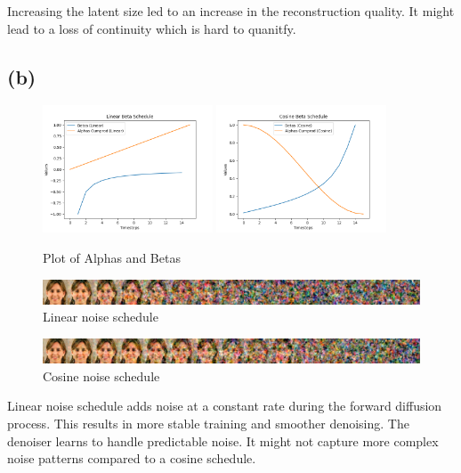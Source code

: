 \documentclass[11pt]{article}
\numberwithin{equation}{section}
\begin{document}
Increasing the latent size led to an increase in the reconstruction quality. It might lead to a loss of continuity which is hard to quanitfy.

\subsection{(b)}

\begin{figure}[h]
	\caption{Plot of Alphas and Betas}
	\label{fig:alphasbetas}
	\centering
	\includegraphics[width=0.45\textwidth]{report/alphas_betas_linear.png}%
	\includegraphics[width=0.45\textwidth]{report/alphas_betas_cosine.png}%
\end{figure}

\vspace{-10pt}


\begin{figure}[h]
	\caption{Linear noise schedule}
	\label{fig:inprec1}
	\centering
	\includegraphics[width=1\textwidth]{report/sample_noised_linear.png}%
\end{figure}
\newpage

\begin{figure}[h]
	\caption{Cosine noise schedule}
	\label{fig:inprec2}
	\centering
	\includegraphics[width=1\textwidth]{report/sample_noised_cosine.png}%
\end{figure}
Linear noise schedule adds noise at a constant rate during the forward diffusion process. This results in more stable training and smoother denoising. The denoiser learns to handle predictable noise. It might not capture more complex noise patterns compared to a cosine schedule.
\end{document}
